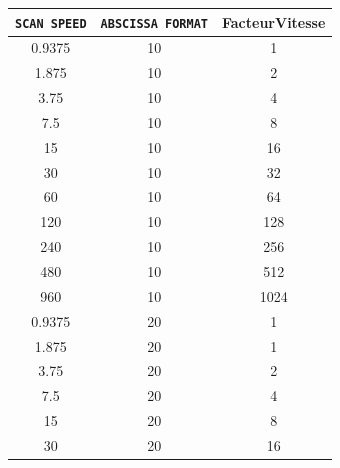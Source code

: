 \documentclass[a4paper, 12pt]{article}
\begin{document}
\begin{description}
\begin{table}[htb]
		\begin{tabular}{|c|c|c|}
		\hline
\verb|SCAN SPEED| & \verb|ABSCISSA FORMAT| & FacteurVitesse \\ \hline
0.9375                           & 10                                    & 1              \\ \hline
1.875                            & 10                                    & 2              \\ \hline
3.75                             & 10                                    & 4              \\ \hline
7.5                              & 10                                    & 8              \\ \hline
15                               & 10                                    & 16             \\ \hline
30                               & 10                                    & 32             \\ \hline
60                               & 10                                    & 64             \\ \hline
120                              & 10                                    & 128            \\ \hline
240                              & 10                                    & 256            \\ \hline
480                              & 10                                    & 512            \\ \hline
960                              & 10                                    & 1024           \\ \hline
0.9375                           & 20                                    & 1              \\ \hline
1.875                            & 20                                    & 1              \\ \hline
3.75                             & 20                                    & 2              \\ \hline
7.5                              & 20                                    & 4              \\ \hline
15                               & 20                                    & 8              \\ \hline
30                               & 20                                    & 16             \\ \hline

\end{tabular}
\end{table}
\end{description}
\end{document}
